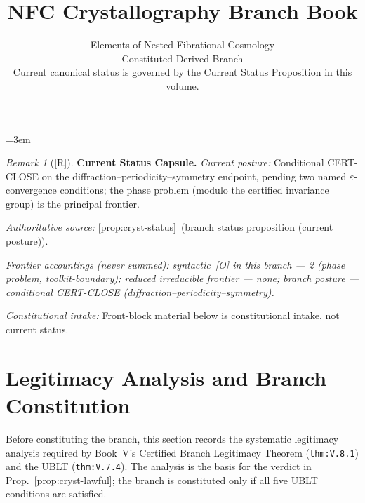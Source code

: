 \documentclass[12pt,oneside]{amsbook}
\theoremstyle{plain}
\theoremstyle{definition}
\theoremstyle{remark}
\newtheorem{remark}[theorem]{Remark}
\newcommand{\status}[1]{\textup{[#1]}}
\begin{document}
\emergencystretch=3em
\raggedbottom

\title{NFC Crystallography Branch Book}
\author{Elements of Nested Fibrational Cosmology\\
        Constituted Derived Branch\\
 {\normalsize Current canonical status is governed by the Current Status Proposition in this volume.}}
\date{}
\maketitle
\tableofcontents
\newpage


\begin{remark}[\status{R}]\label{cap:CRYST-status}
\textbf{Current Status Capsule.}
\emph{Current posture:} Conditional CERT-CLOSE on the diffraction--periodicity--symmetry endpoint, pending two named $\varepsilon$-convergence conditions; the phase problem (modulo the certified invariance group) is the principal frontier.

\emph{Authoritative source:} \ref{prop:cryst-status}~(branch status proposition (current posture)).

\emph{Frontier accountings (never summed): syntactic~[O] in this branch --- 2 (phase problem, toolkit-boundary); reduced irreducible frontier --- none; branch posture --- conditional CERT-CLOSE (diffraction--periodicity--symmetry).}

\emph{Constitutional intake:} Front-block material below is constitutional intake, not current status.
\end{remark}

\section{Legitimacy Analysis and Branch Constitution}
\label{sec:cryst-legitimacy}

Before constituting the branch, this section records the systematic
legitimacy analysis required by Book~V's Certified Branch Legitimacy
Theorem (\texttt{thm:V.8.1}) and the UBLT (\texttt{thm:V.7.4}).
The analysis is the basis for the verdict in
Prop.~\ref{prop:cryst-lawful}; the branch is constituted only if
all five UBLT conditions are satisfied.
\end{document}
